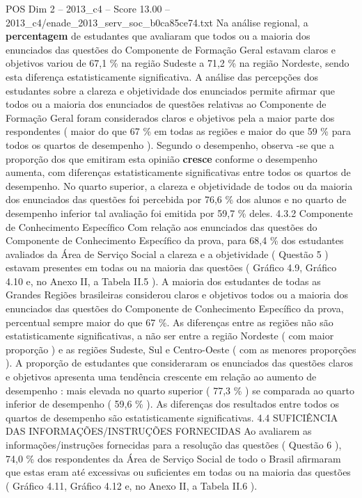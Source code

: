 \begin{textsample}{POS Dim 2 – 2013\_c4 – Score 13.00 – 2013\_c4/enade\_2013\_serv\_soc\_b0ca85ce74.txt}
Na análise regional, a \textbf{percentagem} de estudantes que avaliaram que todos ou a maioria dos enunciados das questões do Componente de Formação Geral estavam claros e objetivos variou de 67,1 \% na região Sudeste a 71,2 \% na região Nordeste, sendo esta diferença estatisticamente significativa.
A análise das percepções dos estudantes sobre a clareza e objetividade dos enunciados permite afirmar que todos ou a maioria dos enunciados de questões relativas ao Componente de Formação Geral foram considerados claros e objetivos pela a maior parte dos respondentes ( maior do que 67 \% em todas as regiões e maior do que 59 \% para todos os quartos de desempenho ).
Segundo o desempenho, observa -se que a proporção dos que emitiram esta opinião \textbf{cresce} conforme o desempenho aumenta, com diferenças estatisticamente significativas entre todos os quartos de desempenho.
No quarto superior, a clareza e objetividade de todos ou da maioria dos enunciados das questões foi percebida por 76,6 \% dos alunos e no quarto de desempenho inferior tal avaliação foi emitida por 59,7 \% deles. 4.3.2 Componente de Conhecimento Específico Com relação aos enunciados das questões do Componente de Conhecimento Específico da prova, para 68,4 \% dos estudantes avaliados da Área de Serviço Social a clareza e a objetividade ( Questão 5 ) estavam presentes em todas ou na maioria das questões ( Gráfico 4.9, Gráfico 4.10 e, no Anexo II, a Tabela II.5 ).
A maioria dos estudantes de todas as Grandes Regiões brasileiras considerou claros e objetivos todos ou a maioria dos enunciados das questões do Componente de Conhecimento Específico da prova, percentual sempre maior do que 67 \%.
As diferenças entre as regiões não são estatisticamente significativas, a não ser entre a região Nordeste ( com maior proporção ) e as regiões Sudeste, Sul e Centro-Oeste ( com as menores proporções ).
A proporção de estudantes que consideraram os enunciados das questões claros e objetivos apresenta uma tendência crescente em relação ao aumento de desempenho : mais elevada no quarto superior ( 77,3 \% ) se comparada ao quarto inferior de desempenho ( 59,6 \% ).
As diferenças dos resultados entre todos os quartos de desempenho são estatisticamente significativas. 4.4 SUFICIÊNCIA DAS INFORMAÇÕES/INSTRUÇÕES FORNECIDAS Ao avaliarem as informações/instruções fornecidas para a resolução das questões ( Questão 6 ), 74,0 \% dos respondentes da Área de Serviço Social de todo o Brasil afirmaram que estas eram até excessivas ou suficientes em todas ou na maioria das questões ( Gráfico 4.11, Gráfico 4.12 e, no Anexo II, a Tabela II.6 ).

\end{textsample}
